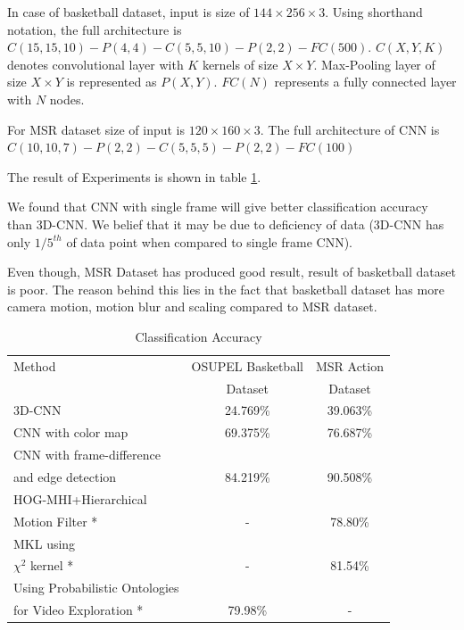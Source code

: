 In case of basketball dataset, input is size of $144 \times 256 \times 3$. Using shorthand notation, the full architecture is $C(15, 15, 10)-P(4, 4)-C(5, 5, 10)-P(2, 2)-FC(500)$. $C(X, Y, K)$ denotes convolutional layer with $K$ kernels of size $X \times Y$. Max-Pooling layer of size $X \times Y$ is represented as $P(X,Y)$. $FC(N)$ represents a fully connected layer with $N$ nodes. 

For MSR dataset size of input is $120 \times 160 \times 3$. The full architecture of CNN is $C(10, 10, 7)-P(2, 2)-C(5, 5, 5)-P(2, 2)-FC(100)$

The result of Experiments is shown in table \ref{table:cnn_res}.

We found that CNN with single frame will give better classification accuracy than 3D-CNN. We belief that it may be due to deficiency of data (3D-CNN has only $1/5^{th}$ of data point when compared to single frame CNN).

Even though, MSR Dataset has produced good result, result of basketball dataset is poor. The reason behind this lies in the fact that basketball dataset has more camera motion, motion blur and scaling compared to MSR dataset.


\begin{table}[h]
\centering
\begin{tabular}{|l|c|c|}
\hline
Method & OSUPEL Basketball& MSR Action\\
       & Dataset          &Dataset \\
\hline
\hline
3D-CNN  &24.769\%   &39.063\% \\
\hline
CNN with color map  &69.375\%   &76.687\% \\
\hline
CNN with frame-difference &&\\
and edge detection &84.219\%   &90.508\% \\
\hline
HOG-MHI+Hierarchical &&\\
Motion Filter * \citep{tian2012hierarchical} & -  &78.80\% \\
\hline
MKL using&&\\
$\chi^2$ kernel * \citep{zhao2014feature} & -  &81.54\% \\
\hline
 Using Probabilistic Ontologies&&\\
 for Video Exploration * \citep{bustamante2012using} & 79.98\%   & - \\
\hline  
\end{tabular}
\caption[Classification Accuracy]{Classification Accuracy}
\label{table:cnn_res}
\end{table} 


